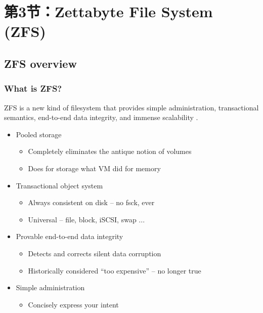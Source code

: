 \section{第3节：Zettabyte File System (ZFS)} %
\subsection{ZFS overview} %
\begin{frame}[fragile]
    \frametitle{What is ZFS?}
    ZFS is a new kind of filesystem that provides simple administration, transactional semantics, end-to-end data integrity, and immense scalability .
    \pause

    \begin{itemize}
        \item Pooled storage
        \begin{itemize}
            \item Completely eliminates the antique notion of volumes
            \item Does for storage what VM did for memory
        \end{itemize} \pause
        \item Transactional object system
        \begin{itemize}
            \item Always consistent on disk – no fsck, ever
            \item Universal – file, block, iSCSI, swap ...
        \end{itemize} \pause
        \item Provable end-to-end data integrity
        \begin{itemize}
            \item Detects and corrects silent data corruption
            \item Historically considered “too expensive” – no longer true
        \end{itemize} \pause
        \item Simple administration
        \begin{itemize}
            \item Concisely express your intent
        \end{itemize}
    \end{itemize}
\end{frame}
